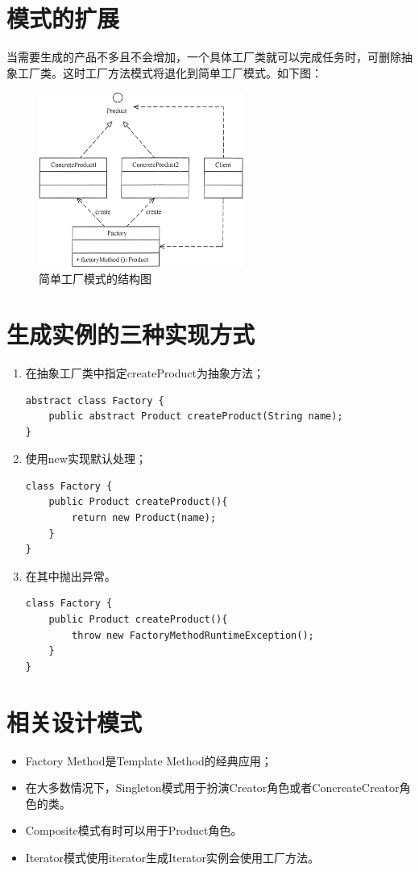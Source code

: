 \section{模式的扩展}
当需要生成的产品不多且不会增加，一个具体工厂类就可以完成任务时，可删除抽象工厂类。这时工厂方法模式将退化到简单工厂模式。如下图：
\begin{figure}[!h]
	\centering
	\includegraphics[width=0.6\textwidth]{image/4-2}
	\caption{简单工厂模式的结构图}
\end{figure}
\section{生成实例的三种实现方式}
\begin{enumerate}
	\item 在抽象工厂类中指定createProduct为抽象方法；
	\begin{lstlisting}
abstract class Factory {
	public abstract Product createProduct(String name);
}
	\end{lstlisting}
	\item 使用new实现默认处理；
	\begin{lstlisting}
class Factory {
	public Product createProduct(){
		return new Product(name);
	}
}
	\end{lstlisting}
	\item 在其中抛出异常。
	\begin{lstlisting}
class Factory {
	public Product createProduct(){
		throw new FactoryMethodRuntimeException();
	}
}
	\end{lstlisting}
\end{enumerate}
\section{相关设计模式}
\begin{itemize}
	\item Factory Method是Template Method的经典应用；
	\item 在大多数情况下，Singleton模式用于扮演Creator角色或者ConcreateCreator角色的类。
	\item Composite模式有时可以用于Product角色。
	\item Iterator模式使用iterator生成Iterator实例会使用工厂方法。
\end{itemize}